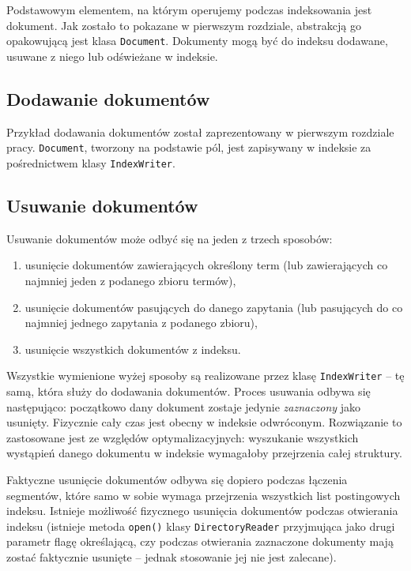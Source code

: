 Podstawowym elementem, na którym operujemy podczas indeksowania jest dokument. Jak zostało to pokazane w pierwszym rozdziale, abstrakcją go opakowującą jest klasa \texttt{Document}. Dokumenty mogą być do indeksu dodawane, usuwane z niego lub odświeżane w indeksie.

\subsection{Dodawanie dokumentów}

Przykład dodawania dokumentów został zaprezentowany w pierwszym rozdziale pracy. \texttt{Document}, tworzony na podstawie pól, jest zapisywany w indeksie za pośrednictwem klasy \texttt{IndexWriter}.

\subsection{Usuwanie dokumentów}

Usuwanie dokumentów może odbyć się na jeden z trzech sposobów: 
\begin{enumerate}
 \item usunięcie dokumentów zawierających określony term (lub zawierających co najmniej jeden z podanego zbioru termów),
 \item usunięcie dokumentów pasujących do danego zapytania (lub pasujących do co najmniej jednego zapytania z podanego zbioru),
 \item usunięcie wszystkich dokumentów z indeksu.
\end{enumerate}

Wszystkie wymienione wyżej sposoby są realizowane przez klasę \texttt{IndexWriter} -- tę samą, która służy do dodawania dokumentów. Proces usuwania odbywa się następująco: początkowo dany dokument zostaje jedynie \emph{zaznaczony} jako usunięty. Fizycznie cały czas jest obecny w indeksie odwróconym. Rozwiązanie to zastosowane jest ze względów optymalizacyjnych: wyszukanie wszystkich wystąpień danego dokumentu w indeksie wymagałoby przejrzenia całej struktury. 

Faktyczne usunięcie dokumentów odbywa się dopiero podczas łączenia segmentów, które samo w sobie wymaga przejrzenia wszystkich list postingowych indeksu. Istnieje możliwość fizycznego usunięcia dokumentów podczas otwierania indeksu (istnieje metoda \texttt{open()} klasy \texttt{DirectoryReader} przyjmująca jako drugi parametr flagę określającą, czy podczas otwierania zaznaczone dokumenty mają zostać faktycznie usunięte -- jednak stosowanie jej nie jest zalecane).

